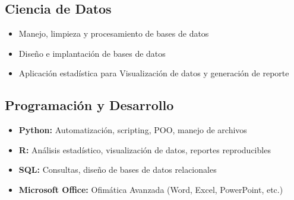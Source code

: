 \documentclass{article}
\begin{document}
\begin{minipage}[t]{0.48\textwidth}

  \subsection{\faDatabase\enspace Ciencia de Datos}
  \begin{itemize}
    \item Manejo, limpieza y procesamiento de bases de datos
    \item Diseño e implantación de bases de datos
    \item Aplicación estadística para Visualización de datos y generación de reporte
  \end{itemize}

  \subsection{\faCode\enspace Programación y Desarrollo}
  \begin{itemize}
    \item \textbf{Python:} Automatización, scripting, POO, manejo de archivos
    \item \textbf{R:} Análisis estadístico, visualización de datos, reportes reproducibles
    \item \textbf{SQL:} Consultas, diseño de bases de datos relacionales
    \item \textbf{Microsoft Office:} Ofimática Avanzada (Word, Excel, PowerPoint, etc.)
  \end{itemize}

\end{minipage}\hfill
\end{document}
